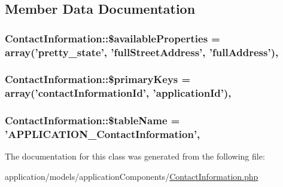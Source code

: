 \subsection{Member Data Documentation}
\hypertarget{class_contact_information_adee9330a334a8a859b50b75e77570dd4}{
\subsubsection[{\$available\-Properties}]{\setlength{\rightskip}{0pt plus 5cm}Contact\-Information\-::\$available\-Properties = array('pretty\-\_\-state', 'full\-Street\-Address', 'full\-Address')\hspace{0.3cm}{\ttfamily [static]}, {\ttfamily [protected]}}}\label{class_contact_information_adee9330a334a8a859b50b75e77570dd4}
\hypertarget{class_contact_information_a3e4c130a0d3f11acfc63116a582d66e3}{
\subsubsection[{\$primary\-Keys}]{\setlength{\rightskip}{0pt plus 5cm}Contact\-Information\-::\$primary\-Keys = array('contact\-Information\-Id', 'application\-Id')\hspace{0.3cm}{\ttfamily [static]}, {\ttfamily [protected]}}}\label{class_contact_information_a3e4c130a0d3f11acfc63116a582d66e3}
\hypertarget{class_contact_information_ade8c9fb16583d1acab57e21eca2cd921}{
\subsubsection[{\$table\-Name}]{\setlength{\rightskip}{0pt plus 5cm}Contact\-Information\-::\$table\-Name = 'A\-P\-P\-L\-I\-C\-A\-T\-I\-O\-N\-\_\-\-Contact\-Information'\hspace{0.3cm}{\ttfamily [static]}, {\ttfamily [protected]}}}\label{class_contact_information_ade8c9fb16583d1acab57e21eca2cd921}


The documentation for this class was generated from the following file\-:\begin{DoxyCompactItemize}
\item 
application/models/application\-Components/\hyperlink{_contact_information_8php}{Contact\-Information.\-php}\end{DoxyCompactItemize}
